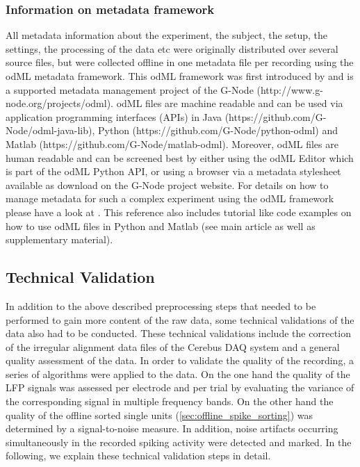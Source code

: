 {\subsubsection{Information on metadata framework}
\label{sec:scidata_metadat_framework}

 All metadata information about the experiment, the subject, the setup, the settings, the processing of the data etc were originally distributed over several source files, but were collected offline in one metadata file per recording using the odML metadata framework. This odML framework was first introduced by \citet{Grewe_2011} and is a supported metadata management project of the G-Node (http://www.g-node.org/projects/odml). odML files are machine readable and can be used via application programming interfaces (APIs) in Java (https://github.com/G-Node/odml-java-lib), Python (https://github.com/G-Node/python-odml) and Matlab (https://github.com/G-Node/matlab-odml). Moreover, odML files are human readable and can be screened best by either using the odML Editor which is part of the odML Python API, or using a browser via a metadata stylesheet available as download on the G-Node project website. For details on how to manage metadata for such a complex experiment using the odML framework please have a look at \citet{Zehl_2016}. This reference also includes tutorial like code examples on how to use odML files in Python and Matlab (see main article as well as supplementary material).

\subsection{Technical Validation}

In addition to the above described preprocessing steps that needed to be performed to gain more content of the raw data, some technical validations of the data also had to be conducted. These technical validations include the correction of the irregular alignment data files of the Cerebus DAQ system and a general quality assessment of the data. In order to validate the quality of the recording, a series of algorithms were applied to the data. On the one hand the quality of the LFP signals was assessed per electrode and per trial by evaluating the variance of the corresponding signal in multiple frequency bands. On the other hand the quality of the offline sorted single units (\cref{sec:offline_spike_sorting}) was determined by a signal-to-noise measure. In addition, noise artifacts occurring simultaneously in the recorded spiking activity were detected and marked. In the following, we explain these technical validation steps in detail.

}
